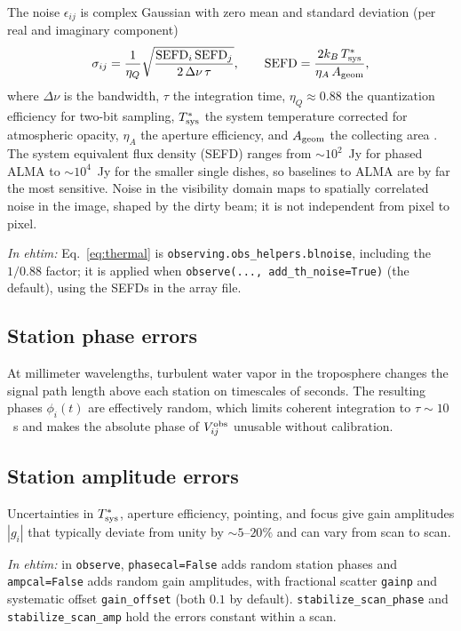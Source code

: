 \documentclass[11pt]{article}
\newcommand{\ehtimnote}[1]{%
  \par\smallskip\noindent
  \colorbox{gray!12}{\parbox{\dimexpr\linewidth-2\fboxsep}{\small\textit{In ehtim:} #1}}%
  \par\smallskip}
\begin{document}
The noise $\epsilon_{ij}$ is complex Gaussian with zero mean and standard
deviation (per real and imaginary component)
\begin{equation}
\sigma_{ij} = \frac{1}{\eta_Q}\sqrt{\frac{{\rm SEFD}_i\,{\rm SEFD}_j}{2\,\Delta\nu\,\tau}},
\qquad
{\rm SEFD} = \frac{2k_B\,T_{\rm sys}^*}{\eta_A\,A_{\rm geom}},
\label{eq:thermal}
\end{equation}
where $\Delta\nu$ is the bandwidth, $\tau$ the integration time,
$\eta_Q \approx 0.88$ the quantization efficiency for two-bit sampling,
$T_{\rm sys}^*$ the system temperature corrected for atmospheric opacity,
$\eta_A$ the aperture efficiency, and $A_{\rm geom}$ the collecting area
\cite{TMS2017}. The system equivalent flux density (SEFD) ranges from
$\sim 10^2$~Jy for phased ALMA to $\sim 10^4$~Jy for the smaller single
dishes, so baselines to ALMA are by far the most sensitive. Noise in the
visibility domain maps to spatially correlated noise in the image, shaped by
the dirty beam; it is not independent from pixel to pixel.

\ehtimnote{Eq.~\eqref{eq:thermal} is \texttt{observing.obs\_helpers.blnoise},
including the $1/0.88$ factor; it is applied when
\texttt{observe(..., add\_th\_noise=True)} (the default), using the SEFDs in
the array file.}

\subsection{Station phase errors}

At millimeter wavelengths, turbulent water vapor in the troposphere changes
the signal path length above each station on timescales of seconds. The
resulting phases $\phi_i(t)$ are effectively random, which limits coherent
integration to $\tau \sim 10$~s and makes the absolute phase of
$V_{ij}^{\rm obs}$ unusable without calibration.

\subsection{Station amplitude errors}

Uncertainties in $T_{\rm sys}^*$, aperture efficiency, pointing, and focus
give gain amplitudes $|g_i|$ that typically deviate from unity by
$\sim 5$--$20\%$ and can vary from scan to scan.

\ehtimnote{in \texttt{observe}, \texttt{phasecal=False} adds random station
phases and \texttt{ampcal=False} adds random gain amplitudes, with fractional
scatter \texttt{gainp} and systematic offset \texttt{gain\_offset} (both
$0.1$ by default). \texttt{stabilize\_scan\_phase} and
\texttt{stabilize\_scan\_amp} hold the errors constant within a scan.}
\end{document}
